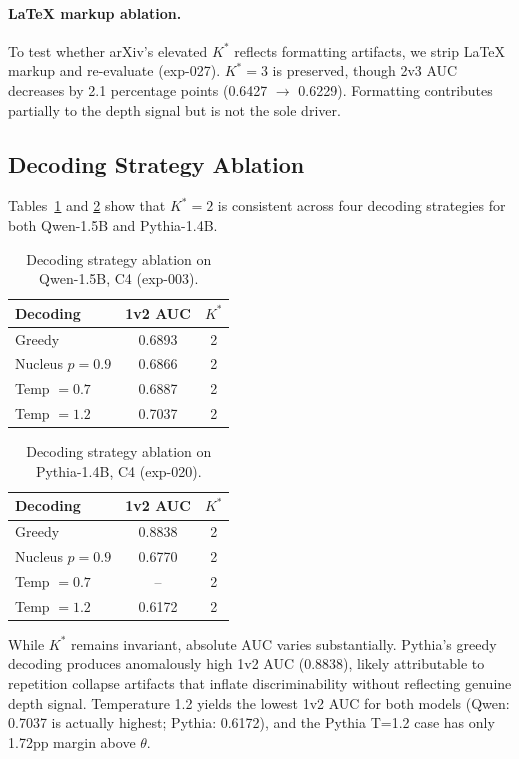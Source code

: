 \documentclass[11pt,a4paper]{article}
\begin{document}
\paragraph{LaTeX markup ablation.}
To test whether arXiv's elevated $K^*$ reflects formatting artifacts, we strip LaTeX markup and re-evaluate (exp-027). $K^*=3$ is preserved, though 2v3 AUC decreases by 2.1 percentage points (0.6427 $\to$ 0.6229). Formatting contributes partially to the depth signal but is not the sole driver.

\subsection{Decoding Strategy Ablation}
\label{sec:decoding}

Tables~\ref{tab:decoding_qwen} and \ref{tab:decoding_pythia} show that $K^*=2$ is consistent across four decoding strategies for both Qwen-1.5B and Pythia-1.4B.

\begin{table}[t]
\centering
\caption{Decoding strategy ablation on Qwen-1.5B, C4 (exp-003).}
\label{tab:decoding_qwen}
\small
\begin{tabular}{lcc}
\toprule
Decoding & 1v2 AUC & $K^*$ \\
\midrule
Greedy & 0.6893 & 2 \\
Nucleus $p=0.9$ & 0.6866 & 2 \\
Temp $= 0.7$ & 0.6887 & 2 \\
Temp $= 1.2$ & 0.7037 & 2 \\
\bottomrule
\end{tabular}
\end{table}

\begin{table}[t]
\centering
\caption{Decoding strategy ablation on Pythia-1.4B, C4 (exp-020).}
\label{tab:decoding_pythia}
\small
\begin{tabular}{lcc}
\toprule
Decoding & 1v2 AUC & $K^*$ \\
\midrule
Greedy & 0.8838 & 2 \\
Nucleus $p=0.9$ & 0.6770 & 2 \\
Temp $= 0.7$ & -- & 2 \\
Temp $= 1.2$ & 0.6172 & 2 \\
\bottomrule
\end{tabular}
\end{table}

While $K^*$ remains invariant, absolute AUC varies substantially. Pythia's greedy decoding produces anomalously high 1v2 AUC (0.8838), likely attributable to repetition collapse artifacts that inflate discriminability without reflecting genuine depth signal. Temperature 1.2 yields the lowest 1v2 AUC for both models (Qwen: 0.7037 is actually highest; Pythia: 0.6172), and the Pythia T=1.2 case has only 1.72pp margin above $\theta$.
\end{document}
